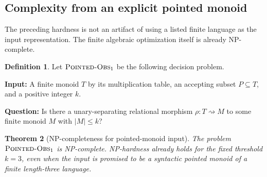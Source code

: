 \documentclass[10pt,a4paper]{article}
\newtheorem{theorem}{Theorem}[section]
\theoremstyle{definition}
\newtheorem{definition}[theorem]{Definition}
\theoremstyle{remark}
\newcommand{\relto}{\mathrel{\rightsquigarrow}}
\begin{document}
\subsection{Complexity from an explicit pointed monoid}

The preceding hardness is not an artifact of using a listed finite language as
the input representation.  The finite algebraic optimization itself is already
NP-complete.

\begin{definition}
Let \({\normalfont\textsc{Pointed-Obs}}_1\) be the following decision problem.

\medskip
\noindent
\textbf{Input:} A finite monoid \(T\) by its multiplication table, an accepting
subset \(P\subseteq T\), and a positive integer \(k\).

\noindent
\textbf{Question:} Is there a unary-separating relational morphism
\(\rho:T\relto M\) to some finite monoid \(M\) with \(|M|\le k\)?
\end{definition}

\begin{theorem}[NP-completeness for pointed-monoid input]
\label{graph:thm:pointed-npcomplete}
The problem \({\normalfont\textsc{Pointed-Obs}}_1\) is NP-complete.  NP-hardness already
holds for the fixed threshold \(k=3\), even when the input is promised to be a
syntactic pointed monoid of a finite length-three language.
\end{theorem}
\end{document}

